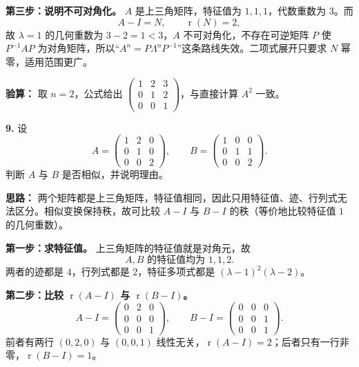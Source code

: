 \textbf{第三步：说明不可对角化。} \(A\) 是上三角矩阵，特征值为 \(1,1,1\)，代数重数为 \(3\)。而
\[
A-I=N,\qquad \operatorname{r}(N)=2,
\]
故 \(\lambda=1\) 的几何重数为 \(3-2=1<3\)，\(A\) 不可对角化，不存在可逆矩阵 \(P\) 使 \(P^{-1}AP\) 为对角矩阵，所以“\(A^n=P\Lambda^nP^{-1}\)”这条路线失效。二项式展开只要求 \(N\) 幂零，适用范围更广。

\textbf{验算：} 取 \(n=2\)，公式给出 \(\begin{pmatrix}1&2&3\\0&1&2\\0&0&1\end{pmatrix}\)，与直接计算 \(A^2\) 一致。

\else \answerarea[10] \fi%

\textbf{9.} 设
\[
A=\begin{pmatrix}1&2&0\\0&1&0\\0&0&2\end{pmatrix},
\qquad
B=\begin{pmatrix}1&0&0\\0&1&1\\0&0&2\end{pmatrix}.
\]
判断 \(A\) 与 \(B\) 是否相似，并说明理由。

\ifshowsolutions%
\textbf{思路：} 两个矩阵都是上三角矩阵，特征值相同，因此只用特征值、迹、行列式无法区分。相似变换保持秩，故可比较 \(A-I\) 与 \(B-I\) 的秩（等价地比较特征值 \(1\) 的几何重数）。

\textbf{第一步：求特征值。} 上三角矩阵的特征值就是对角元，故
\[
A,B\text{ 的特征值均为 }1,1,2.
\]
两者的迹都是 \(4\)，行列式都是 \(2\)，特征多项式都是 \((\lambda-1)^2(\lambda-2)\)。

\textbf{第二步：比较 \(\operatorname{r}(A-I)\) 与 \(\operatorname{r}(B-I)\)。}
\[
A-I=\begin{pmatrix}0&2&0\\0&0&0\\0&0&1\end{pmatrix},\qquad
B-I=\begin{pmatrix}0&0&0\\0&0&1\\0&0&1\end{pmatrix}.
\]
前者有两行 \((0,2,0)\) 与 \((0,0,1)\) 线性无关，\(\operatorname{r}(A-I)=2\)；后者只有一行非零，\(\operatorname{r}(B-I)=1\)。

